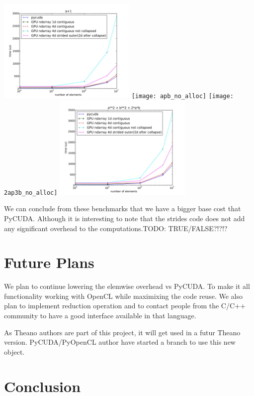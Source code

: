 \documentclass{article} %
\begin{document}
\includegraphics[width=0.5\textwidth]{ap1_no_alloc}
\texttt{[image: apb\_no\_alloc]}
\texttt{[image: 2ap3b\_no\_alloc]}
\includegraphics[width=0.5\textwidth]{a2pb2p2ab_no_alloc}

We can conclude from these benchmarks that we have a bigger base cost that PyCUDA.
Although it is interesting to note that the strides code does not add any significant overhead to the computations.TODO: TRUE/FALSE?!?!?

\section{Future Plans}

We plan to continue lowering the elemwise overhead vs PyCUDA. To make
it all functionality working with OpenCL while maximixing the code
reuse. We also plan to implement reduction operation and to contact
people from the C/C++ community to have a good interface available in
that language.

As Theano authors are part of this project, it will get used in a futur Theano version. PyCUDA/PyOpenCL author have started a branch to use this new object.

\section{Conclusion}
\end{document}
